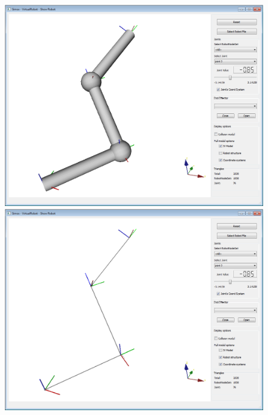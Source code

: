 \documentclass{book}
\begin{document}
\begin{figure}[H]
	\centering
	\begin{minipage} {.45\linewidth}
	  \includegraphics[width=\linewidth]{Tutorial4a}
	\end{minipage}
	\begin{minipage} {.45\linewidth}
	  \includegraphics[width=\linewidth]{Tutorial4b}
	\end{minipage}
\end{figure}
\par
\end{document}
